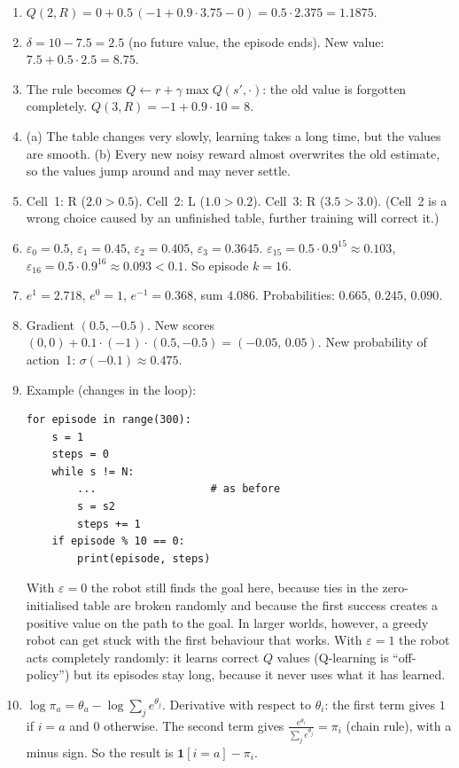 \begin{enumerate}[label=\textbf{\ansnum.\arabic*}]
  \item $Q(2,R)=0+0.5\,(-1+0.9\cdot3.75-0)=0.5\cdot2.375=1.1875$.
  \item $\delta=10-7.5=2.5$ (no future value, the episode ends). New value: $7.5+0.5\cdot2.5=8.75$.
  \item The rule becomes $Q\leftarrow r+\gamma\max Q(s',\cdot)$: the old value is forgotten completely. $Q(3,R)=-1+0.9\cdot10=8$.
  \item (a) The table changes very slowly, learning takes a long time, but the values are smooth. (b) Every new noisy reward almost overwrites the old estimate, so the values jump around and may never settle.
  \item Cell~1: R ($2.0>0.5$). Cell~2: L ($1.0>0.2$). Cell~3: R ($3.5>3.0$). (Cell~2 is a wrong choice caused by an unfinished table, further training will correct it.)
  \item $\varepsilon_0=0.5$, $\varepsilon_1=0.45$, $\varepsilon_2=0.405$, $\varepsilon_3=0.3645$. $\varepsilon_{15}=0.5\cdot0.9^{15}\approx0.103$, $\varepsilon_{16}=0.5\cdot0.9^{16}\approx0.093<0.1$. So episode $k=16$.
  \item $e^1=2.718$, $e^0=1$, $e^{-1}=0.368$, sum $4.086$. Probabilities: $0.665$, $0.245$, $0.090$.
  \item Gradient $(0.5,-0.5)$. New scores $(0,0)+0.1\cdot(-1)\cdot(0.5,-0.5)=(-0.05,\,0.05)$. New probability of action~1: $\sigma(-0.1)\approx0.475$.
  \item Example (changes in the loop):
\begin{verbatim}
for episode in range(300):
    s = 1
    steps = 0
    while s != N:
        ...                  # as before
        s = s2
        steps += 1
    if episode % 10 == 0:
        print(episode, steps)
\end{verbatim}
  With $\varepsilon=0$ the robot still finds the goal here, because ties in the zero-initialised table are broken randomly and because the first success creates a positive value on the path to the goal. In larger worlds, however, a greedy robot can get stuck with the first behaviour that works. With $\varepsilon=1$ the robot acts completely randomly: it learns correct $Q$ values (Q-learning is ``off-policy'') but its episodes stay long, because it never uses what it has learned.
  \item[\textbf{\ansnum.10}] $\log\pi_a=\theta_a-\log\sum_je^{\theta_j}$. Derivative with respect to $\theta_i$: the first term gives $1$ if $i=a$ and $0$ otherwise. The second term gives $\frac{e^{\theta_i}}{\sum_je^{\theta_j}}=\pi_i$ (chain rule), with a minus sign. So the result is $\mathbf 1[i=a]-\pi_i$.
\end{enumerate}

